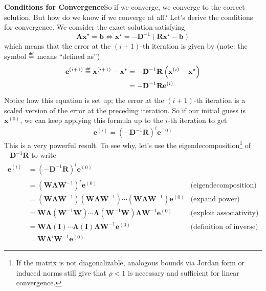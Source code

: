 \textbf{Conditions for Convergence}\quad So if we converge, we converge to the correct solution. But how do we know if we converge at all? Let's derive the conditions for convergence. We consider the exact solution satisfying
\begin{equation*}
    \mathbf{A x}^\star = \mathbf{b} \iff \mathbf{x}^\star = -\mathbf{D}^{-1}\left(\mathbf{R}\mathbf{x}^\star - \mathbf{b}\right)
\end{equation*}
which means that the error at the $(i+1)$-th iteration is given by (note: the symbol $\mydef$ means ``defined as'')
\begin{align*}
    \mathbf{e}^{(i+1)} \mydef \mathbf{x}^{(i+1)} - \mathbf{x}^* &= -\mathbf{D}^{-1}\mathbf{R}\left(\mathbf{x}^{(i)} - \mathbf{x}^\star\right) \\
    &= -\mathbf{D}^{-1}\mathbf{R}\mathbf{e}^{(i)}
\end{align*}
Notice how this equation is set up; the error at the $(i+1)$-th iteration is a scaled version of the error at the preceding iteration. So if our initial guess is $\mathbf{x}^{(0)}$, we can keep applying this formula up to the $i$-th iteration to get
\begin{equation*}
    \mathbf{e}^{(i)} = \left( -\mathbf{D}^{-1}\mathbf{R} \right)^i \mathbf{e}^{(0)}
\end{equation*}
This is a very powerful result. To see why, let's use the eigendecomposition\footnote{If the matrix is not diagonalizable, analogous bounds via Jordan form or induced norms still give that $\rho<1$ is necessary and sufficient for linear convergence.} of $-\mathbf{D}^{-1}\mathbf{R}$ to write
\begin{align*}
    \mathbf{e}^{(i)} &=  \left( -\mathbf{D}^{-1}\mathbf{R} \right)^i \mathbf{e}^{(0)} & \\
    &= \left(\mathbf{W} \boldsymbol{\Lambda} \mathbf{W}^{-1}\right)^i \mathbf{e}^{(0)} &\text{(eigendecomposition)} \\
    &= \left(\mathbf{W} \boldsymbol{\Lambda} \mathbf{W}^{-1}\right)\left(\mathbf{W} \boldsymbol{\Lambda} \mathbf{W}^{-1}\right)\cdots\left(\mathbf{W} \boldsymbol{\Lambda} \mathbf{W}^{-1}\right) \mathbf{e}^{(0)} &\text{(expand power)}\\
    &= \mathbf{W} \boldsymbol{\Lambda} \left(\mathbf{W}^{-1}\mathbf{W}\right)\cdots \boldsymbol{\Lambda} \left(\mathbf{W}^{-1}\mathbf{W}\right) \boldsymbol{\Lambda} \mathbf{W}^{-1}\mathbf{e}^{(0)} &\text{(exploit associativity)} \\
    &= \mathbf{W} \boldsymbol{\Lambda} \left(\mathbf{I}\right)\cdots \boldsymbol{\Lambda} \left(\mathbf{I}\right) \boldsymbol{\Lambda} \mathbf{W}^{-1} \mathbf{e}^{(0)} &\text{(definition of inverse)} \\
    &= \mathbf{W} \boldsymbol{\Lambda}^i \mathbf{W}^{-1} \mathbf{e}^{(0)} &
\end{align*}
